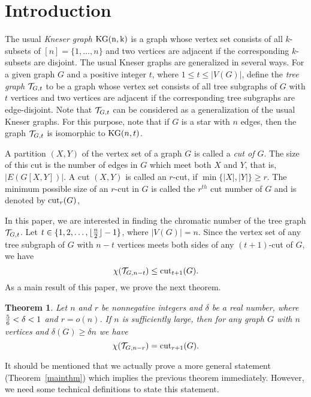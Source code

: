 \documentclass[11pt]{article}
\newtheorem{prethm}{{\bf Theorem}}
\newenvironment{thm}{\begin{prethm}{\hspace{-0.5
               em}{\bf.\ }}}{\end{prethm}}
\begin{document}
\section{Introduction}
 The usual {\it Kneser graph} ${\rm KG(n,k)}$ is a graph whose vertex set consists of all $k$-subsets of $[n]=\{1,\ldots,n\}$ and two vertices are adjacent if the corresponding $k$-subsets are disjoint. 
The usual Kneser graphs are generalized in several ways. For a given graph $G$ and a positive integer $t$, where  $1\leq t\leq |V(G)|$,  
define the {\it tree graph} ${\cal T}_{G,t}$ to be a graph whose vertex set consists of all tree subgraphs of $G$ with $t$ vertices and two vertices are adjacent if the corresponding tree subgraphs are edge-disjoint. 
Note that ${\cal T}_{G,t}$ can be considered as a generalization of the usual Kneser graphs.
For this purpose, note that if $G$ is a star with $n$ edges, then the graph ${\cal T}_{G,t}$ is isomorphic  to ${\rm KG}(n,t)$. 
 
A partition $(X,Y)$ of the vertex set of a graph $G$ is called a {\it cut of $G$}.
 The size of this cut is the number of edges in $G$ which meet both $X$ and $Y$, that is, 
 $|E(G[X,Y])|$. A cut $(X,Y)$ is called an $r$-cut, if $\min\{|X|,|Y|\}\geq r$.
The minimum possible size of an $r$-cut in $G$ is called the $r^{th}$ cut number of $G$ and is denoted by ${\rm cut}_r(G)$,
 
 In this paper, we are interested in finding the chromatic number of the tree graph ${\cal T}_{G,t}$. 
Let $t\in\{1,2,\ldots,\lfloor{n\over 2}\rfloor-1\}$, where $|V(G)|=n$. Since the vertex set of any tree subgraph of $G$ with $n-t$ vertices meets both sides of any $(t+1)$-cut of $G$, we have  $$\chi({\cal T}_{G,n-t})\leq {\rm cut}_{t+1}(G).$$
As a main result of this paper, we prove the next theorem.
\begin{thm}\label{firstthm}
Let $n$ and $r$ be nonnegative integers and $\delta$ be a real number, where 
${5\over 6}< \delta < 1$ and $r=o(n)$.
If $n$ is sufficiently large, then
for any graph $G$ with $n$ vertices and $\delta(G)\geq \delta n$ we have 
$$\chi({\cal T}_{G,n-r})={\rm cut}_{r+1}(G).$$
\end{thm}
It should be mentioned that we actually  prove a more general statement (Theorem~\ref{mainthm}) which implies the previous theorem immediately. However, we need some technical definitions to state this statement.
\end{document}
